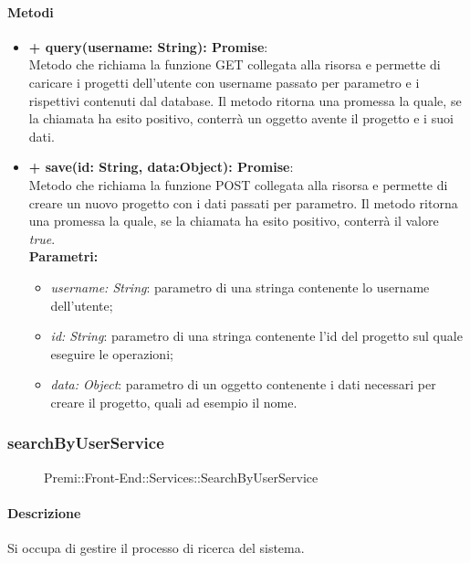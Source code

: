 	\paragraph{Metodi}
	\begin{itemize}
		\item \textbf{+ query(username: String): Promise}:\\
			Metodo che richiama la funzione GET collegata alla risorsa e permette di caricare i progetti dell'utente con username passato per parametro e i rispettivi contenuti dal database. Il metodo ritorna una promessa la quale, se la chiamata ha esito positivo, conterrà un oggetto avente il progetto e i suoi dati.\\
		\item \textbf{+ save(id: String, data:Object): Promise}:\\
			Metodo che richiama la funzione POST collegata alla risorsa e permette di creare un nuovo progetto con i dati passati per parametro. Il metodo ritorna una promessa la quale, se la chiamata ha esito positivo, conterrà il valore \textit{true}.\\
		\textbf{Parametri:}\\
		\begin{itemize}
			\item \textit{username: String}: parametro di una stringa contenente lo username dell'utente;
			\item \textit{id: String}: parametro di una stringa contenente l'id del progetto sul quale eseguire le operazioni;
			\item \textit{data: Object}: parametro di un oggetto contenente i dati necessari per creare il progetto, quali ad esempio il nome.
		\end{itemize}
	\end{itemize}
	
	
\subsubsection{searchByUserService}
	\begin{figure}[h]
		\centering
		\caption[Premi::Front-End::Services::SearchByUserService]{Premi::Front-End::Services::SearchByUserService}
	\end{figure}
	
	\paragraph{Descrizione}
	Si occupa di gestire il processo di ricerca del sistema.
	
